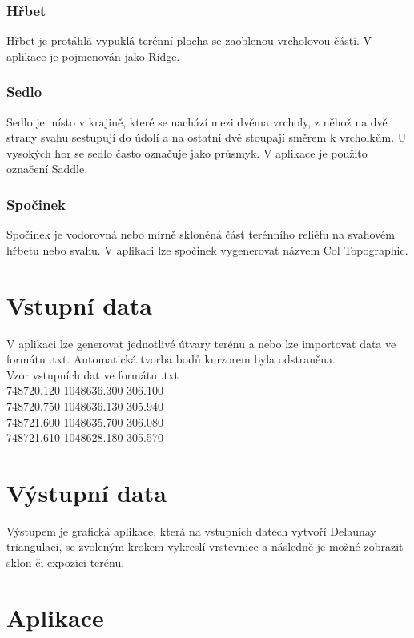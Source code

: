 \documentclass[a4paper, 12pt]{article}
\begin{document}
\subsubsection{Hřbet}
Hřbet je protáhlá vypuklá terénní plocha se zaoblenou vrcholovou částí. V aplikace je pojmenován jako Ridge.

\subsubsection{Sedlo}
Sedlo je místo v krajině, které se nachází mezi dvěma vrcholy, z něhož na dvě strany svahu sestupují do údolí a na ostatní dvě stoupají směrem k vrcholkům. U vysokých hor se sedlo často označuje jako průsmyk. V aplikace je použito označení Saddle.

\subsubsection{Spočinek}
Spočinek je vodorovná nebo mírně skloněná část terénního reliéfu na svahovém hřbetu nebo svahu. V aplikaci lze spočinek vygenerovat názvem Col Topographic.



\section{Vstupní data}
V aplikaci lze generovat jednotlivé útvary terénu a nebo lze importovat data ve formátu .txt. Automatická tvorba bodů kurzorem byla odstraněna.\\

Vzor vstupních dat ve formátu .txt\\
 748720.120    1048636.300     306.100\\
 748720.750    1048636.130     305.940\\
 748721.600    1048635.700     306.080\\
 748721.610    1048628.180     305.570\\

\section{Výstupní data}
Výstupem je grafická aplikace, která na vstupních datech vytvoří Delaunay triangulaci, se zvoleným krokem vykreslí vrstevnice a následně je možné zobrazit sklon či expozici terénu. 

\clearpage
\section{Aplikace}
\end{document}
